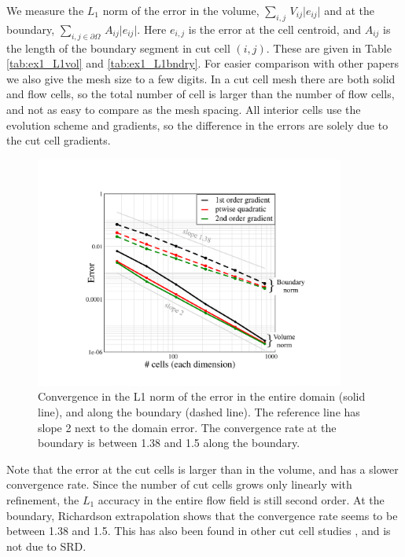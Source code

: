We measure the $L_1$ norm of the error in the volume,   $\sum_{i,j} \,
V_{ij} \lvert e_{ij } \rvert$ and at the boundary, $ \sum_{{i,j} \in \partial \Omega} \, A_{ij} \lvert e_{ij
} \rvert$.  Here
$e_{i,j}$ is the error at the cell centroid, and $A_{ij}$ is the length of the 
boundary segment in cut cell $(i,j)$.
These are given in Table \ref{tab:ex1_L1vol} and \ref{tab:ex1_L1bndry}. 
For easier comparison with other papers we also give the mesh size 
to a few digits. In  a cut cell mesh there are both solid and
flow cells, so the total number of cell is larger than the number of
flow cells, and not as easy to compare as the mesh spacing.
All interior cells use the evolution scheme and gradients, so
the difference in the errors are solely due to the cut cell gradients.

\begin{figure}[h]
	\begin{center}
		\includegraphics[height=3.0in]{figs/gradientConv.pdf}
		\caption{\sf Convergence in the L1 norm of the error in the entire 
			domain  (solid line), and along the boundary (dashed line).
			The reference line has slope 2 next to the domain error. The convergence
			rate at the boundary is between 1.38 and 1.5
			along the boundary.
			\label{fig:ssv}}
	\end{center}
\end{figure}


Note that the error at the cut cells is larger than in the volume, and has a
slower convergence rate. Since the number of cut cells grows only
linearly with refinement, the $L_1$
accuracy in the entire flow field is still second order.  At the boundary,
Richardson extrapolation shows that the convergence rate seems to be
between 1.38 and 1.5.
This has also been found in other cut cell studies \cite{KB:2006,nemec_tm14}, and 
is not due to SRD.

